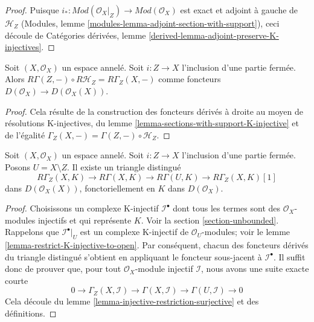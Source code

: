 \begin{proof}
Puisque $i_* : \textit{Mod}(\mathcal{O}_X|_Z) \to \textit{Mod}(\mathcal{O}_X)$ est exact et adjoint à gauche de $\mathcal{H}_Z$ (Modules, lemme \ref{modules-lemma-adjoint-section-with-support}), ceci découle de Catégories dérivées, lemme \ref{derived-lemma-adjoint-preserve-K-injectives}.
\end{proof}

\begin{lemma}

\label{lemma-local-to-global-sections-with-support}
Soit $(X, \mathcal{O}_X)$ un espace annelé. Soit $i : Z \to X$ l'inclusion d'une partie fermée. Alors $R\Gamma(Z, - ) \circ R\mathcal{H}_Z = R\Gamma_Z(X, - )$ comme foncteurs $D(\mathcal{O}_X) \to D(\mathcal{O}_X(X))$.
\end{lemma}

\begin{proof}
Cela résulte de la construction des foncteurs dérivés à droite au moyen de résolutions K-injectives, du lemme \ref{lemma-sections-with-support-K-injective} et de l'égalité $\Gamma_Z(X, -) = \Gamma(Z, -) \circ \mathcal{H}_Z$.
\end{proof}

\begin{lemma}

\label{lemma-triangle-sections-with-support}
Soit $(X, \mathcal{O}_X)$ un espace annelé. Soit $i : Z \to X$ l'inclusion d'une partie fermée. Posons $U = X \setminus Z$. Il existe un triangle distingué $$
R\Gamma_Z(X, K) \to R\Gamma(X, K) \to R\Gamma(U, K) \to
R\Gamma_Z(X, K)[1]
$$ dans $D(\mathcal{O}_X(X))$, fonctoriellement en $K$ dans $D(\mathcal{O}_X)$.
\end{lemma}

\begin{proof}

Choisissons un complexe K-injectif $\mathcal{I}^\bullet$ dont tous les termes sont des $\mathcal{O}_X$-modules injectifs et qui représente $K$. Voir la section \ref{section-unbounded}. Rappelons que $\mathcal{I}^\bullet|_U$
est un complexe K-injectif de $\mathcal{O}_U$-modules; voir le lemme \ref{lemma-restrict-K-injective-to-open}. Par conséquent, chacun des foncteurs dérivés du triangle distingué s'obtient en appliquant le foncteur sous-jacent à $\mathcal{I}^\bullet$. Il suffit donc de prouver que, pour tout $\mathcal{O}_X$-module injectif $\mathcal{I}$, nous avons une suite exacte courte
$$
0 \to \Gamma_Z(X, \mathcal{I}) \to \Gamma(X, \mathcal{I})
\to \Gamma(U, \mathcal{I}) \to 0
$$
Cela découle du lemme \ref{lemma-injective-restriction-surjective}
et des définitions.

\end{proof}

